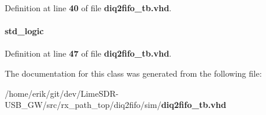Definition at line {\bf 40} of file {\bf diq2fifo\+\_\+tb.\+vhd}.

\paragraph[{reset\+\_\+n}]{ {\bfseries \textcolor{comment}{std\+\_\+logic}\textcolor{vhdlchar}{ }} \hspace{0.3cm}{\ttfamily [Signal]}}\label{classdiq2fifo__tb_1_1tb__behave_a1f070fd63a3a7fa45c907335ea870c5b}


Definition at line {\bf 47} of file {\bf diq2fifo\+\_\+tb.\+vhd}.



The documentation for this class was generated from the following file\+:\begin{DoxyCompactItemize}
\item 
/home/erik/git/dev/\+Lime\+S\+D\+R-\/\+U\+S\+B\+\_\+\+G\+W/src/rx\+\_\+path\+\_\+top/diq2fifo/sim/{\bf diq2fifo\+\_\+tb.\+vhd}\end{DoxyCompactItemize}
